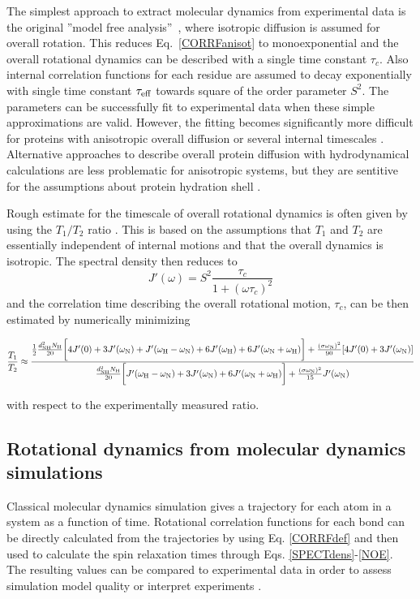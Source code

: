 \documentclass[pre,aps,floatfix,authordate1-4,twocolumn]{revtex4-1}
\begin{document}
The simplest approach to extract molecular dynamics from experimental
data is the original ''model free analysis''~\cite{Lipari82},
where isotropic diffusion is assumed for overall rotation.
This reduces Eq.~\ref{CORRFanisot} to monoexponential and the overall rotational
dynamics can be described with a single time constant $\tau_c$.
Also internal correlation functions for each residue are assumed
to decay exponentially with single time constant $\tau_{\rm eff}$
towards square of the order parameter $S^2$. The parameters can be
successfully fit to experimental data when these simple approximations
are valid. However, the fitting becomes significantly more difficult for proteins 
with anisotropic overall diffusion or several internal timescales \cite{dosset00,luginbuhl97,jarymowycz06}.
Alternative approaches to describe overall protein diffusion with hydrodynamical
calculations are less problematic for anisotropic systems, but they
are sentitive for the assumptions about protein hydration shell \cite{torre00}.

Rough estimate for the timescale of overall rotational dynamics 
is often given by using the $T_1/T_2$ ratio \cite{kay89}. 
This is based on the assumptions that $T_1$ and $T_2$
are essentially independent of internal motions and that the overall
dynamics is isotropic. The spectral density then reduces to 
\begin{equation}
J'(\omega) = S^2\frac{\tau_c}{1+(\omega \tau_c)^2} 
\end{equation}
and the correlation time describing the overall rotational motion, $\tau_c$, can 
be then estimated by numerically minimizing
\begin{widetext}
\begin{equation}\label{ratioEQ}
  \frac{T_1}{T_2} \approx  \frac{\frac{1}{2}\frac{d_{\rm{NH}}^2N_{\rm{H}}}{20}\bigg[4J'(0)+3J'(\omega_{\rm{N}})+J'(\omega_{\rm{H}}-\omega_{\rm{N}})+6J'(\omega_{\rm{H}})  +6J'(\omega_{\rm{N}}+\omega_{\rm{H}})\bigg]+\frac{(\sigma \omega_{\rm{N}})^2}{90}[4J'(0) +3J'(\omega_{\rm{N}})]}{\frac{d_{\rm{NH}}^2N_{\rm{H}}}{20}\bigg[J'(\omega_{\rm{H}}-\omega_{\rm{N}})+3J'(\omega_{\rm{N}})+6J'(\omega_{\rm{N}}+\omega_{\rm{H}})\bigg] +\frac{(\sigma \omega_{\rm{N}})^2}{15}J'(\omega_{\rm{N}})}
\end{equation}
\end{widetext}
with respect to the experimentally measured ratio.

\subsection{Rotational dynamics from molecular dynamics simulations}\label{MDanalysis}
Classical molecular dynamics simulation gives a trajectory for each atom in
a system as a function of time. Rotational correlation functions for each bond
can be directly calculated from the trajectories by using Eq. \ref{CORRFdef}
and then used to calculate the spin relaxation times through Eqs. \ref{SPECTdens}-\ref{NOE}.
The resulting values can be compared to experimental data in order to assess simulation model
quality \cite{best04,showalter07a,showalter07b,maragakis08,trbovic08,fisette12} or
interpret experiments \cite{fisette12}.
\end{document}
